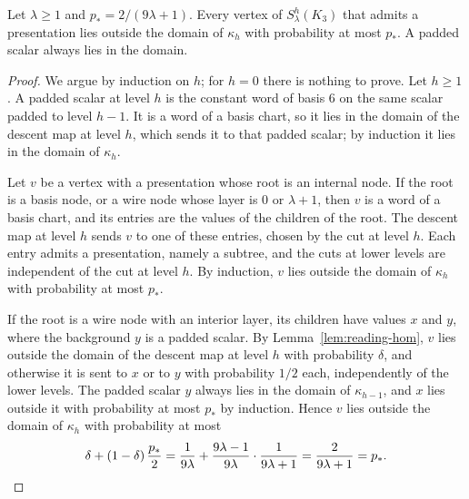 \begin{lemma}\label{lem:reading-failure}
Let $\lambda\ge1$ and $p_*=2/(9\lambda+1)$. Every vertex of $S^h_\lambda(K_3)$ that admits a presentation lies outside the domain of $\kappa_h$ with probability at most $p_*$. A padded scalar always lies in the domain.
\end{lemma}
\begin{proof}
We argue by induction on $h$; for $h=0$ there is nothing to prove. Let $h\ge1$. A padded scalar at level $h$ is the constant word of basis $6$ on the same scalar padded to level $h-1$. It is a word of a basis chart, so it lies in the domain of the descent map at level $h$, which sends it to that padded scalar; by induction it lies in the domain of $\kappa_h$.

Let $v$ be a vertex with a presentation whose root is an internal node. If the root is a basis node, or a wire node whose layer is $0$ or $\lambda+1$, then $v$ is a word of a basis chart, and its entries are the values of the children of the root. The descent map at level $h$ sends $v$ to one of these entries, chosen by the cut at level $h$. Each entry admits a presentation, namely a subtree, and the cuts at lower levels are independent of the cut at level $h$. By induction, $v$ lies outside the domain of $\kappa_h$ with probability at most $p_*$.

If the root is a wire node with an interior layer, its children have values $x$ and $y$, where the background $y$ is a padded scalar. By Lemma~\ref{lem:reading-hom}, $v$ lies outside the domain of the descent map at level $h$ with probability $\delta$, and otherwise it is sent to $x$ or to $y$ with probability $1/2$ each, independently of the lower levels. The padded scalar $y$ always lies in the domain of $\kappa_{h-1}$, and $x$ lies outside it with probability at most $p_*$ by induction. Hence $v$ lies outside the domain of $\kappa_h$ with probability at most
\[
 \delta+(1-\delta)\,\frac{p_*}{2}
 =\frac{1}{9\lambda}+\frac{9\lambda-1}{9\lambda}\cdot\frac{1}{9\lambda+1}
 =\frac{2}{9\lambda+1}=p_* .\qedhere
\]
\end{proof}

